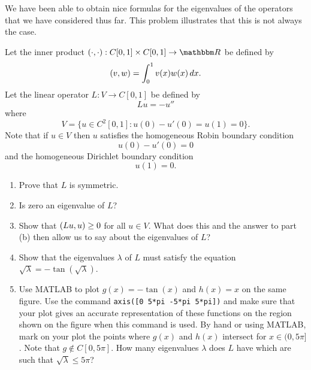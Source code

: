 We have been able to obtain nice formulas for the eigenvalues of the operators that we have considered thus far. This problem illustrates that this is not always the case.

Let the inner product $\ip{\cdot,\cdot}:C[0,1]\times C[0,1]\to\R$ be defined by
\[
(v,w)=\int_0^1v(x)w(x)\,dx.
\]
Let the linear operator $L: V\to C[0,1]$ be defined by
\[
Lu = -u''
\]
where
\[ V = \{u\in C^2[0,1]:  u(0)-u'(0)=u(1)=0\}.\]
Note that if $u\in V$ then $u$ satisfies the homogeneous Robin boundary condition
\[ u(0) - u'(0) = 0\]
and the homogeneous Dirichlet boundary condition
\[ u(1) = 0.\]

\begin{enumerate}
\item Prove that $L$ is symmetric.
\\
\item Is zero an eigenvalue of $L$?
\\
\item Show that $(Lu,u)\ge0$ for all $u\in V$. What does this and the answer to part (b) then allow us to say about the eigenvalues of $L$?
\\
\item Show that the eigenvalues $\lambda$ of $L$ must satisfy the equation $\sqrt{\lambda} = - \tan(\sqrt{\lambda})$.
\\
\item Use MATLAB to plot $g(x) = -\tan(x)$ and $h(x)=x$ on the same figure. Use the command \verb|axis([0 5*pi -5*pi 5*pi])| and make sure that your plot gives an accurate representation of these functions on the region shown on the figure when this command is used. By hand or using MATLAB, mark on your plot the points where $g(x)$ and $h(x)$ intersect for $x\in(0,5\pi]$. Note that $g\notin C[0, 5\pi]$. How many eigenvalues $\lambda$ does $L$ have which are such that $\sqrt{\lambda}\le 5\pi$?
\end{enumerate}


